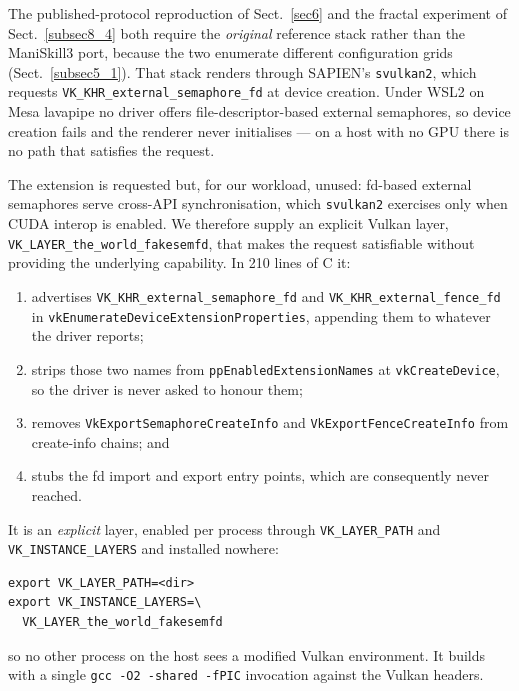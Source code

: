 \documentclass[pdflatex,iicol,sn-apa]{sn-jnl}
\theoremstyle{remark}
\begin{document}
\begin{appendices}
The published-protocol reproduction of Sect.~\ref{sec6} and the fractal experiment of
Sect.~\ref{subsec8_4} both require the \emph{original} reference stack rather than the ManiSkill3
port, because the two enumerate different configuration grids (Sect.~\ref{subsec5_1}). That stack
renders through SAPIEN's \texttt{svulkan2}, which requests
\texttt{VK\_KHR\_external\_semaphore\_fd} at device creation. Under WSL2 on Mesa lavapipe no
driver offers file-descriptor-based external semaphores, so device creation fails and the renderer
never initialises --- on a host with no GPU there is no path that satisfies the request.

The extension is requested but, for our workload, unused: fd-based external semaphores serve
cross-API synchronisation, which \texttt{svulkan2} exercises only when CUDA interop is enabled. We
therefore supply an explicit Vulkan layer, \texttt{VK\_LAYER\_the\_world\_fakesemfd}, that makes
the request satisfiable without providing the underlying capability. In 210 lines of C it:

\begin{enumerate}
\item advertises \texttt{VK\_KHR\_external\_semaphore\_fd} and
\texttt{VK\_KHR\_external\_fence\_fd} in \texttt{vkEnumerateDeviceExtensionProperties}, appending
them to whatever the driver reports;
\item strips those two names from \texttt{ppEnabledExtensionNames} at \texttt{vkCreateDevice}, so
the driver is never asked to honour them;
\item removes \texttt{VkExportSemaphoreCreateInfo} and \texttt{VkExportFenceCreateInfo} from
create-info chains; and
\item stubs the fd import and export entry points, which are consequently never reached.
\end{enumerate}

It is an \emph{explicit} layer, enabled per process through \texttt{VK\_LAYER\_PATH} and
\texttt{VK\_INSTANCE\_LAYERS} and installed nowhere:

\begin{verbatim}
export VK_LAYER_PATH=<dir>
export VK_INSTANCE_LAYERS=\
  VK_LAYER_the_world_fakesemfd
\end{verbatim}

\noindent so no other process on the host sees a modified Vulkan environment. It builds with a
single \texttt{gcc -O2 -shared -fPIC} invocation against the Vulkan headers.


\end{appendices}
\end{document}
